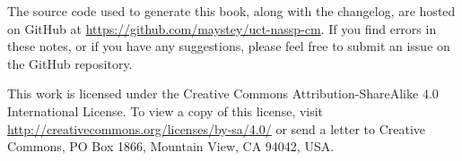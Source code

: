 The source code used to generate this book, along with the changelog, are hosted on GitHub at \url{https://github.com/maystey/uct-nassp-cm}. If you find errors in these notes, or if you have any suggestions, please feel free to submit an issue on the GitHub repository.

This work is licensed under the Creative Commons Attribution-ShareAlike 4.0 International License. To view a copy of this license, visit \url{http://creativecommons.org/licenses/by-sa/4.0/} or send a letter to Creative Commons, PO Box 1866, Mountain View, CA 94042, USA.







